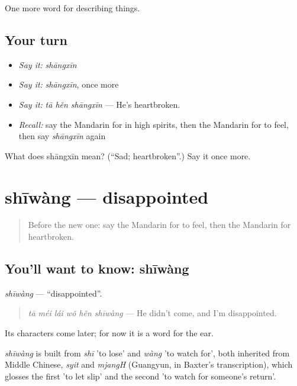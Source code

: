 \begin{grammarlens}[title={What you've built}]
One more word for describing things.
\end{grammarlens}

\subsection*{Your turn}
\begin{itemize}
\raggedright
  \item \emph{Say it:} \emph{shāngxīn}
  \item \emph{Say it:} \emph{shāngxīn}, once more
  \item \emph{Say it:} \emph{tā hěn shāngxīn} — He's heartbroken.
  \item \emph{Recall:} say the Mandarin for in high spirits, then the Mandarin for to feel, then say \emph{shāngxīn} again
\end{itemize}

\begin{tcolorbox}[breakable,colback=teal!4,colframe=teal!35!black,title={Before you move on}]
What does shāngxīn mean? (\textquotedblleft{}Sad; heartbroken\textquotedblright{}.) Say it once more.
\end{tcolorbox}
\section[shīwàng]{shīwàng — disappointed}

\label{lesson:ZH-C252-shiwang}



\begin{quote}
Before the new one: say the Mandarin for to feel, then the Mandarin for heartbroken.
\end{quote}

\subsection*{You'll want to know: shīwàng}
\emph{shīwàng} — \textquotedblleft{}disappointed\textquotedblright{}.

\begin{quote}
\emph{tā méi lái wǒ hěn shīwàng} — He didn't come, and I'm disappointed.
\end{quote}

Its characters come later; for now it is a word for the ear.

\begin{cousinweb}
\emph{shīwàng} is built from \emph{shī} 'to lose' and \emph{wàng} 'to watch for', both inherited from Middle Chinese, \emph{syit} and \emph{mjangH} (Guangyun, in Baxter's transcription), which glosses the first 'to let slip' and the second 'to watch for someone's return'.
\end{cousinweb}

